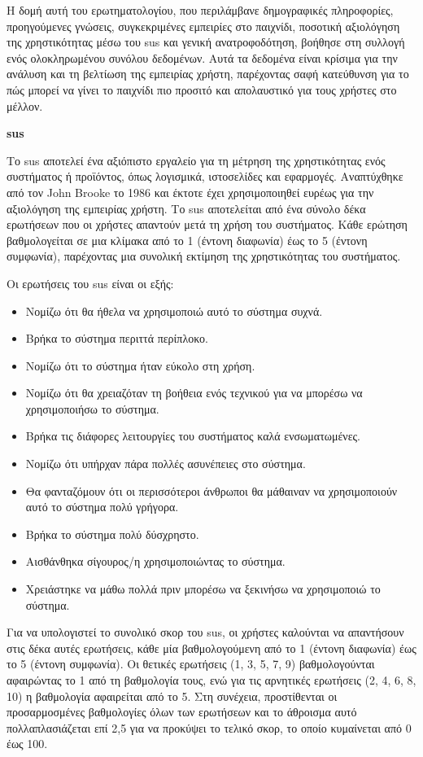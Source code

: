 Η δομή αυτή του ερωτηματολογίου, που περιλάμβανε δημογραφικές πληροφορίες, προηγούμενες γνώσεις, συγκεκριμένες εμπειρίες στο παιχνίδι, ποσοτική αξιολόγηση της χρηστικότητας μέσω του \acrshort{sus} και γενική ανατροφοδότηση, βοήθησε στη συλλογή ενός ολοκληρωμένου συνόλου δεδομένων. Αυτά τα δεδομένα είναι κρίσιμα για την ανάλυση και τη βελτίωση της εμπειρίας χρήστη, παρέχοντας σαφή κατεύθυνση για το πώς μπορεί να γίνει το παιχνίδι πιο προσιτό και απολαυστικό για τους χρήστες στο μέλλον.

\textbf{\acrfull{sus}}

Το \acrfull{sus} αποτελεί ένα αξιόπιστο εργαλείο για τη μέτρηση της χρηστικότητας ενός συστήματος ή προϊόντος, όπως λογισμικά, ιστοσελίδες και εφαρμογές. Αναπτύχθηκε από τον John Brooke το 1986 και έκτοτε έχει χρησιμοποιηθεί ευρέως για την αξιολόγηση της εμπειρίας χρήστη. Το \acrshort{sus} αποτελείται από ένα σύνολο δέκα ερωτήσεων που οι χρήστες απαντούν μετά τη χρήση του συστήματος. Κάθε ερώτηση βαθμολογείται σε μια κλίμακα από το 1 (έντονη διαφωνία) έως το 5 (έντονη συμφωνία), παρέχοντας μια συνολική εκτίμηση της χρηστικότητας του συστήματος\cite{noauthor_what_nodate}.

Οι ερωτήσεις του \acrshort{sus} είναι οι εξής:

\begin{itemize}
    \item Νομίζω ότι θα ήθελα να χρησιμοποιώ αυτό το σύστημα συχνά.
    \item Βρήκα το σύστημα περιττά περίπλοκο.
    \item Νομίζω ότι το σύστημα ήταν εύκολο στη χρήση.
    \item Νομίζω ότι θα χρειαζόταν τη βοήθεια ενός τεχνικού για να μπορέσω να χρησιμοποιήσω το σύστημα.
    \item Βρήκα τις διάφορες λειτουργίες του συστήματος καλά ενσωματωμένες.
    \item Νομίζω ότι υπήρχαν πάρα πολλές ασυνέπειες στο σύστημα.
    \item Θα φανταζόμουν ότι οι περισσότεροι άνθρωποι θα μάθαιναν να χρησιμοποιούν αυτό το σύστημα πολύ γρήγορα.
    \item Βρήκα το σύστημα πολύ δύσχρηστο.
    \item Αισθάνθηκα σίγουρος/η χρησιμοποιώντας το σύστημα.
    \item Χρειάστηκε να μάθω πολλά πριν μπορέσω να ξεκινήσω να χρησιμοποιώ το σύστημα.
\end{itemize}

Για να υπολογιστεί το συνολικό σκορ του \acrshort{sus}, οι χρήστες καλούνται να απαντήσουν στις δέκα αυτές ερωτήσεις, κάθε μία βαθμολογούμενη από το 1 (έντονη διαφωνία) έως το 5 (έντονη συμφωνία). Οι θετικές ερωτήσεις (1, 3, 5, 7, 9) βαθμολογούνται αφαιρώντας το 1 από τη βαθμολογία τους, ενώ για τις αρνητικές ερωτήσεις (2, 4, 6, 8, 10) η βαθμολογία αφαιρείται από το 5. Στη συνέχεια, προστίθενται οι προσαρμοσμένες βαθμολογίες όλων των ερωτήσεων και το άθροισμα αυτό πολλαπλασιάζεται επί 2,5 για να προκύψει το τελικό σκορ, το οποίο κυμαίνεται από 0 έως 100\cite{brooke_sus_1995}.

